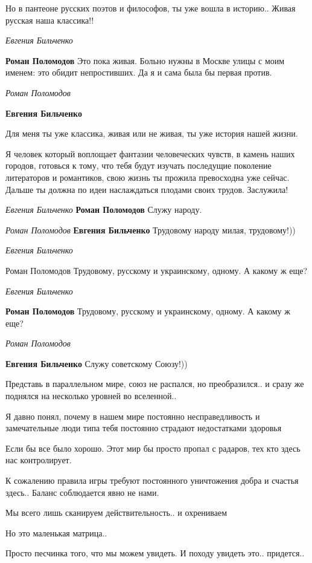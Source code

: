 Но в пантеоне русских поэтов и философов, ты уже вошла в историю..  Живая
русская наша классика!!

\emph{Евгения Бильченко}

\textbf{Роман Поломодов} Это пока живая. Больно нужны в Москве улицы с моим
именем: это обидит непростивших. Да я и сама была бы первая против.

\emph{Роман Поломодов}

\textbf{Евгения Бильченко}

Для меня ты уже классика, живая или не живая, ты уже история нашей жизни.

Я человек который воплощает фантазии человеческих чувств, в камень наших
городов, готовься к тому, что тебя будут изучать последущие поколение
литераторов и романтиков, свою жизнь ты прожила превосходна уже сейчас. Дальше
ты должна по идеи наслаждаться плодами своих трудов. Заслужила!

\emph{Евгения Бильченко}
\textbf{Роман Поломодов} Служу народу.

\emph{Роман Поломодов}
\textbf{Евгения Бильченко}
Трудовому народу милая, трудовому!))

\emph{Евгения Бильченко}

Роман Поломодов Трудовому, русскому и украинскому, одному. А какому ж еще?

\emph{Евгения Бильченко}

\textbf{Роман Поломодов} Трудовому, русскому и украинскому, одному. А какому ж еще?

\emph{Роман Поломодов}

\textbf{Евгения Бильченко}
Служу советскому Союзу!))

Представь в параллельном мире, союз не распался, но преобразился.. и сразу же
поднялся на несколько уровней во вселенной..

Я давно понял, почему в нашем мире постоянно несправедливость и замечательные
люди типа тебя постоянно страдают недостатками здоровья

Если бы все было хорошо. Этот мир бы просто пропал с радаров, тех кто здесь нас
контролирует.

К сожалению правила игры требуют постоянного уничтожения добра и счастья
здесь.. Баланс соблюдается явно не нами.

Мы всего лишь сканируем действительность.. и охрениваем

Но это маленькая матрица..

Просто песчинка того, что мы можем увидеть. И походу увидеть это.. придется..

